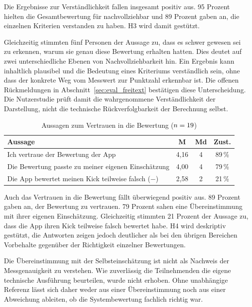 \documentclass[intern]{cgMA}
\begin{document}
Die Ergebnisse zur Verständlichkeit fallen insgesamt positiv aus. 95 Prozent hielten die Gesamtbewertung für nachvollziehbar und 89 Prozent gaben an, die einzelnen Kriterien verstanden zu haben. H3 wird damit gestützt.

Gleichzeitig stimmten fünf Personen der Aussage zu, dass es schwer gewesen sei zu erkennen, warum sie genau diese Bewertung erhalten hatten. Dies deutet auf zwei unterschiedliche Ebenen von Nachvollziehbarkeit hin. Ein Ergebnis kann inhaltlich plausibel und die Bedeutung eines Kriteriums verständlich sein, ohne dass der konkrete Weg vom Messwert zur Punktzahl erkennbar ist. Die offenen Rückmeldungen in Abschnitt~\ref{sec:eval_freitext} bestätigen diese Unterscheidung. Die Nutzerstudie prüft damit die wahrgenommene Verständlichkeit der Darstellung, nicht die technische Rückverfolgbarkeit der Berechnung selbst.

\begin{table}[htbp]
\centering
\small
\begin{tabular}{p{} c c c}
\hline
\textbf{Aussage} & \textbf{M} & \textbf{Md} & \textbf{Zust.} \\ \hline
Ich vertraue der Bewertung der App & 4,16 & 4 & 89\,\% \\
Die Bewertung passte zu meiner eigenen Einschätzung & 4,00 & 4 & 79\,\% \\
Die App bewertet meinen Kick teilweise falsch ($-$) & 2,58 & 2 & 21\,\% \\ \hline
\end{tabular}
\caption{Aussagen zum Vertrauen in die Bewertung ($n=19$)}
\label{tab:eval_vertrauen}
\end{table}

Auch das Vertrauen in die Bewertung fällt überwiegend positiv aus. 89 Prozent gaben an, der Bewertung zu vertrauen. 79 Prozent sahen eine Übereinstimmung mit ihrer eigenen Einschätzung. Gleichzeitig stimmten 21 Prozent der Aussage zu, dass die App ihren Kick teilweise falsch bewertet habe. H4 wird deskriptiv gestützt, die Antworten zeigen jedoch deutlicher als bei den übrigen Bereichen Vorbehalte gegenüber der Richtigkeit einzelner Bewertungen.

Die Übereinstimmung mit der Selbsteinschätzung ist nicht als Nachweis der Messgenauigkeit zu verstehen. Wie zuverlässig die Teilnehmenden die eigene technische Ausführung beurteilen, wurde nicht erhoben. Ohne unabhängige Referenz lässt sich daher weder aus einer Übereinstimmung noch aus einer Abweichung ableiten, ob die Systembewertung fachlich richtig war.
\end{document}
